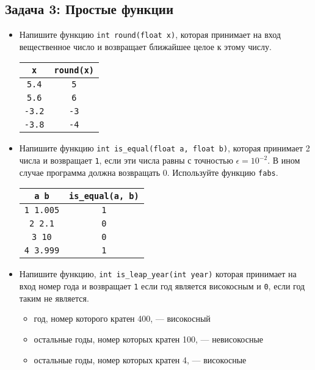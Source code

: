 \documentclass{article}
\begin{document}
\subsection*{Задача 3: Простые функции}
\begin{itemize}
\item Напишите функцию \texttt{int round(float x)}, которая принимает на вход вещественное число и возвращает ближайшее целое к этому числу.
\begin{center}
\begin{tabular}{ c c }
 \texttt{x} & \texttt{round(x)} \\ \hline
 \texttt{5.4} & \texttt{5}  \\ 
 \texttt{5.6} & \texttt{6}  \\ 
 \texttt{-3.2} & \texttt{-3} \\ 
 \texttt{-3.8} & \texttt{-4} \\   
\end{tabular}
\end{center}

\item Напишите функцию \texttt{int is\_equal(float a, float b)}, которая принимает 2 числа и возвращает \texttt{1}, если эти числа равны с точностью $\epsilon = 10^{-2}$. В ином случае программа должна возвращать 0. Используйте функцию \texttt{fabs}.
\begin{center}
\begin{tabular}{ c c }
 \texttt{a b} & \texttt{is\_equal(a, b)} \\ \hline
 \texttt{1 1.005} & \texttt{1}  \\ 
 \texttt{2 2.1} & \texttt{0}  \\ 
 \texttt{3 10} & \texttt{0} \\ 
 \texttt{4 3.999} & \texttt{1} \\   
\end{tabular}
\end{center}

\item Напишите функцию, \texttt{int is\_leap\_year(int year)} которая принимает на вход номер года и возвращает \texttt{1} если год является високосным и \texttt{0}, если год таким не является.
\begin{itemize}
\item год, номер которого кратен 400, — високосный
\item остальные годы, номер которых кратен 100, — невисокосные
\item остальные годы, номер которых кратен 4, — високосные
\end{itemize}


\end{itemize}
\end{document}
